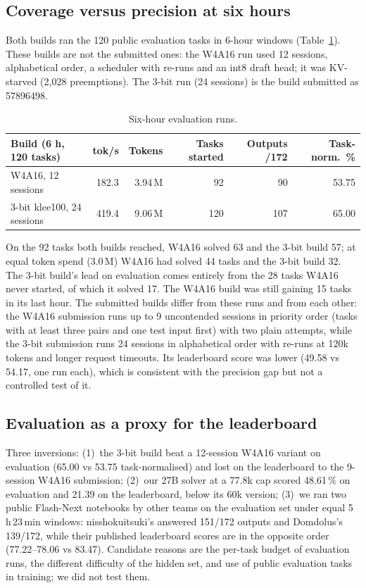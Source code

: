 \documentclass[11pt]{article}
\begin{document}
\subsection{Coverage versus precision at six hours}\label{sec:six}
Both builds ran the 120 public evaluation tasks in 6-hour windows (Table~\ref{tab:six}). These builds are not the submitted ones: the W4A16 run used 12 sessions, alphabetical order, a scheduler with re-runs and an int8 draft head; it was KV-starved (2{,}028 preemptions). The 3-bit run (24 sessions) is the build submitted as 57896498.
\begin{table}[tbp]
\centering\small
\begin{tabular}{@{}lrrrrr@{}}
\toprule
Build (6 h, 120 tasks) & tok/s & Tokens & Tasks started & Outputs /172 & Task-norm.\ \% \\
\midrule
W4A16, 12 sessions & 182.3 & 3.94\,M & 92 & 90 & 53.75 \\
3-bit klee100, 24 sessions & 419.4 & 9.06\,M & 120 & 107 & 65.00 \\
\bottomrule
\end{tabular}
\caption{Six-hour evaluation runs.}
\label{tab:six}
\end{table}
On the 92 tasks both builds reached, W4A16 solved 63 and the 3-bit build 57; at equal token spend (3.0\,M) W4A16 had solved 44 tasks and the 3-bit build 32. The 3-bit build's lead on evaluation comes entirely from the 28 tasks W4A16 never started, of which it solved 17. The W4A16 build was still gaining 15 tasks in its last hour.
The submitted builds differ from these runs and from each other: the W4A16 submission runs up to 9 uncontended sessions in priority order (tasks with at least three pairs and one test input first) with two plain attempts, while the 3-bit submission runs 24 sessions in alphabetical order with re-runs at 120k tokens and longer request timeouts. Its leaderboard score was lower (49.58 vs 54.17, one run each), which is consistent with the precision gap but not a controlled test of it.

\subsection{Evaluation as a proxy for the leaderboard}
Three inversions: (1)~the 3-bit build beat a 12-session W4A16 variant on evaluation (65.00 vs 53.75 task-normalised) and lost on the leaderboard to the 9-session W4A16 submission; (2)~our 27B solver at a 77.8k cap scored 48.61\,\% on evaluation and 21.39 on the leaderboard, below its 60k version; (3)~we ran two public Flash-Next notebooks by other teams on the evaluation set under equal 5\,h\,23\,min windows: nisshokuitsuki's \cite{ni2026} answered 151/172 outputs and Domdolus's \cite{domdolus2026} 139/172, while their published leaderboard scores are in the opposite order (77.22--78.06 vs 83.47). Candidate reasons are the per-task budget of evaluation runs, the different difficulty of the hidden set, and use of public evaluation tasks in training; we did not test them.
\end{document}
